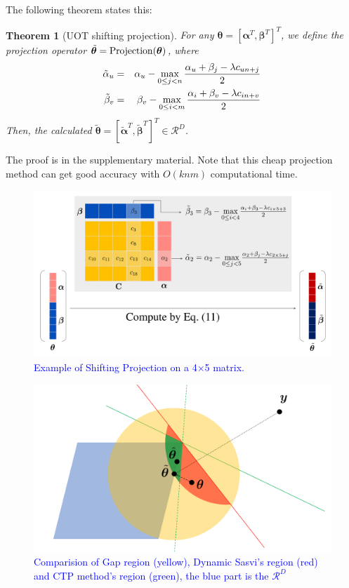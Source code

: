\documentclass[twoside]{article}
\theoremstyle{plain}
\newtheorem{thm}{Theorem}
\renewcommand{\vec}[1]{\bm{#1}}
\newcommand{\changeXS}[1]{\textcolor{blue}{#1}}
\begin{document}
The following theorem states this:
\begin{thm}[UOT shifting projection]
\label{Thm:UOT_ShiftProjection}
For any $\vec{\theta} = [{\vec{\alpha}}^T,{\vec{\beta}}^T]^T$, we define the projection operator $\tilde{\vec{\theta}}={\rm Projection}(\vec{\theta})$, where 
\changeXS{
\begin{eqnarray}
\tilde{{\alpha}}_u &=& {{\alpha}}_u - \max_{0\leq j < n} \frac{{{\alpha}}_u +{{\beta}}_j - \lambda{c}_{un+j}}{2} \notag\\
\tilde{{\beta}}_v &=& {{\beta}}_v - \max_{0 \leq i < m} \frac{{{\alpha}}_i +{{\beta}}_v - \lambda{c}_{in+v}}{2}\\
\label{eq:uotproj}
\end{eqnarray}
}
Then, the calculated $\tilde{\vec{\theta}} = [\tilde{\vec{\alpha}}^T,\tilde{\vec{\beta}}^T]^T \in \mathcal{R}^{D}$.
\end{thm}
The proof is in the supplementary material. Note that this cheap projection method can get good accuracy with $O(knm)$ computational time. 

\begin{figure}[h]
\centering
\includegraphics[width = \linewidth]{pic/matrix}
\caption{\changeXS{Example of Shifting Projection on a 4$\times$5 matrix.}}
\label{Fig:structure}
\end{figure}



\begin{figure}[h]
\centering
\includegraphics[width = \linewidth]{pic/area}
\caption{\changeXS{Comparision of Gap region (yellow), Dynamic Sasvi's region (red) and CTP method's region (green), the blue part is the $\mathcal{R}^{D}$}}
\end{figure}
\end{document}
